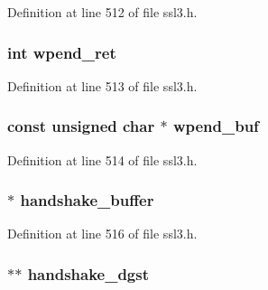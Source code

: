 Definition at line 512 of file ssl3.\+h.

\subsubsection[{\texorpdfstring{wpend\+\_\+ret}{wpend_ret}}]{\setlength{\rightskip}{0pt plus 5cm}int wpend\+\_\+ret}\hypertarget{structssl3__state__st_ae2dce92eac9ce1ec1dc53125a72f87b4}{}\label{structssl3__state__st_ae2dce92eac9ce1ec1dc53125a72f87b4}


Definition at line 513 of file ssl3.\+h.

\subsubsection[{\texorpdfstring{wpend\+\_\+buf}{wpend_buf}}]{\setlength{\rightskip}{0pt plus 5cm}const unsigned char $\ast$ wpend\+\_\+buf}\hypertarget{structssl3__state__st_ae1aceb1506bb5d92de935aed9b925959}{}\label{structssl3__state__st_ae1aceb1506bb5d92de935aed9b925959}


Definition at line 514 of file ssl3.\+h.

\subsubsection[{\texorpdfstring{handshake\+\_\+buffer}{handshake_buffer}}]{ $\ast$ handshake\+\_\+buffer}\hypertarget{structssl3__state__st_a2249e642f6921d8cd62d5a7fe3f0f738}{}\label{structssl3__state__st_a2249e642f6921d8cd62d5a7fe3f0f738}


Definition at line 516 of file ssl3.\+h.

\subsubsection[{\texorpdfstring{handshake\+\_\+dgst}{handshake_dgst}}]{ $\ast$$\ast$ handshake\+\_\+dgst}\hypertarget{structssl3__state__st_a3368952ef0749399a7435b7a40958911}{}\label{structssl3__state__st_a3368952ef0749399a7435b7a40958911}


